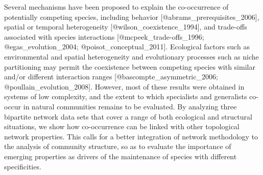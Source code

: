 Several mechanisms have been proposed to explain the co-occurrence of
potentially competing species, including behavior [@abrams_prerequisites_2006],
spatial or temporal heterogeneity [@wilson_coexistence_1994], and
trade-offs associated with species interactions [@mcpeek_trade-offs_1996;
@egas_evolution_2004; @poisot_conceptual_2011]. Ecological factors such as
environmental and spatial heterogeneity and evolutionary processes such as
niche partitioning may permit the coexistence between competing species with
similar and/or different interaction ranges [@bascompte_asymmetric_2006;
@poullain_evolution_2008]. However, most of these results were obtained
in systems of low complexity, and the extent to which specialists and
generalists co-occur in natural communities remains to be evaluated. By
analyzing three bipartite network data sets that cover a range of both
ecological and structural situations, we show how co-occurrence can be
linked with other topological network properties. This calls for a better
integration of network methodology to the analysis of community structure,
so as to evaluate the importance of emerging properties as drivers of the
maintenance of species with different specificities.

